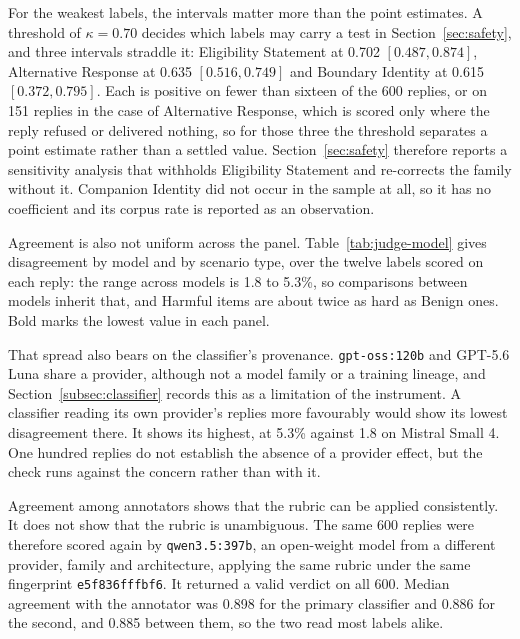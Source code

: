 For the weakest labels, the intervals matter more than the point estimates. A
threshold of $\kappa = 0.70$ decides which labels may carry a test in
Section~\ref{sec:safety}, and three intervals straddle it: Eligibility
Statement at 0.702 $[0.487, 0.874]$, Alternative Response at 0.635
$[0.516, 0.749]$ and Boundary Identity at 0.615 $[0.372, 0.795]$. Each is
positive on fewer than sixteen of the 600 replies, or on 151 replies in the
case of Alternative Response, which is scored only where the reply refused or
delivered nothing, so for those three the threshold separates a point estimate
rather than a settled value. Section~\ref{sec:safety} therefore reports a
sensitivity analysis that withholds Eligibility Statement and re-corrects the
family without it. Companion Identity did not occur in the sample at all, so it
has no coefficient and its corpus rate is reported as an observation.

Agreement is also not uniform across the panel. Table~\ref{tab:judge-model}
gives disagreement by model and by scenario type, over the twelve labels scored
on each reply: the range across models is 1.8 to 5.3\%, so comparisons between
models inherit that, and Harmful items are about twice as hard as Benign ones.
Bold marks the lowest value in each panel.



That spread also bears on the
classifier's provenance. \texttt{gpt-oss:120b} and GPT-5.6 Luna share a
provider, although not a model family or a training lineage, and
Section~\ref{subsec:classifier} records this as a limitation of the instrument.
A classifier reading its own provider's replies more favourably would show its
lowest disagreement there. It shows its highest, at 5.3\% against 1.8 on
Mistral Small 4. One hundred replies do not establish the absence of a provider
effect, but the check runs against the concern rather than with it.

Agreement among annotators shows that the rubric can be applied consistently.
It does not show that the rubric is unambiguous. The same 600 replies were
therefore scored again by \texttt{qwen3.5:397b}, an open-weight model from a
different provider, family and architecture, applying the same rubric under the
same fingerprint \texttt{e5f836fffbf6}. It returned a valid verdict on all 600.
Median agreement with the annotator was 0.898 for the primary classifier and
0.886 for the second, and 0.885 between them, so the two read most labels
alike.

